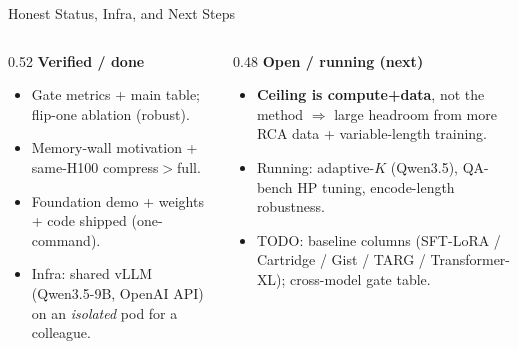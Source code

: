 \begin{frame}{Honest Status, Infra, and Next Steps}
  \small
  \begin{columns}[T]
    \begin{column}{0.52\textwidth}
      \textbf{Verified / done}
      \begin{itemize}\scriptsize
        \item Gate metrics + main table; flip-one ablation (robust).
        \item Memory-wall motivation + same-H100 compress$>$full.
        \item Foundation demo + weights + code shipped (one-command).
        \item Infra: shared vLLM (Qwen3.5-9B, OpenAI API) on an \emph{isolated} pod for a colleague.
      \end{itemize}
    \end{column}
    \begin{column}{0.48\textwidth}
      \textbf{Open / running (next)}
      \begin{itemize}\scriptsize
        \item \textbf{Ceiling is compute+data}, not the method $\Rightarrow$ large headroom from more RCA data + variable-length training.
        \item Running: adaptive-$K$ (Qwen3.5), QA-bench HP tuning, encode-length robustness.
        \item TODO: baseline columns (SFT-LoRA / Cartridge / Gist / TARG / Transformer-XL); cross-model gate table.
      \end{itemize}
    \end{column}
  \end{columns}
\end{frame}
